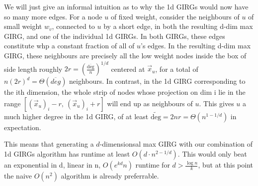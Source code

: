
We will just give an informal intuition as to why the 1d GIRGs would now have so many more edges.
For a node $u$ of fixed weight, consider the neighbours of $u$ of small weight $w_v$, connected to $u$ by a short edge, in both the resulting d-dim max GIRG, and one of the individual 1d GIRGs.
In both GIRGs, these edges constitute whp a constant fraction of all of $u$'s edges.
In the resulting d-dim max GIRG, these neighbours are precisely all the low weight nodes inside the box of side length roughly $2r = \left ( \frac{\overline{\text{deg}}}{ n} \right )^{1/d}$ centered at $\vec{x}_u$, for a total of $n (2r)^d = \Theta(\overline{deg})$ neighbours.
In contrast, in the 1d GIRG corresponding to the ith dimension, the whole strip of nodes whose projection on dim i lie in the range $[(\vec{x}_u)_i - r,\: (\vec{x}_u)_i +r]$ will end up as neighbours of $u$.
This gives $u$ a much higher degree in the 1d GIRG, of at least $\widetilde{\text{deg}} = 2nr = \Theta(n^{1 - 1/d})$ in expectation.




This means that generating a $d$-dimensionsal max GIRG with our combination of 1d GIRGs algorithm has runtime at least $O(d \cdot n^{2 - 1/d})$. This would only beat an exponential in d, linear in n, $O(e^{kd} n)$ runtime for $d > \frac{\log n}{k}$, but at this point the naive $O(n^2)$ algorithm is already preferrable.

